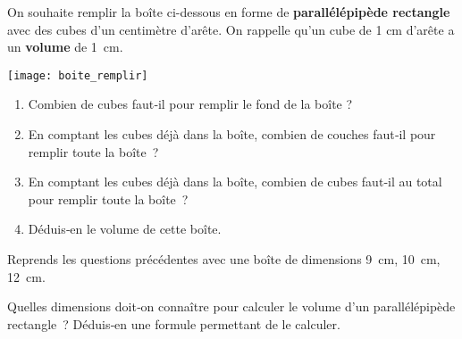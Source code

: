 
\begin{activite}

\begin{partie}
On souhaite remplir la boîte ci-dessous en forme de \textbf{parallélépipède rectangle} avec des cubes d'un centimètre d'arête. On rappelle qu'un cube de 1 cm d'arête a un \textbf{volume} de 1 cm. \\[0.5em]
\begin{center}  \texttt{[image: boite\_remplir]} \end{center}
\begin{enumerate}
 \item Combien de cubes faut‑il pour remplir le fond de la boîte ?
 \item En comptant les cubes déjà dans la boîte, combien de couches faut‑il pour remplir toute la boîte ?
 \item En comptant les cubes déjà dans la boîte, combien de cubes faut‑il au total pour remplir toute la boîte ?
 \item Déduis‑en le volume de cette boîte.
 \end{enumerate}
\end{partie}

\begin{partie}
Reprends les questions précédentes avec une boîte de dimensions 9 cm, 10 cm, 12 cm.
\end{partie}

\begin{partie}
Quelles dimensions doit‑on connaître pour calculer le volume d'un parallélépipède rectangle ? Déduis‑en une formule permettant de le calculer.
\end{partie}

\end{activite}


